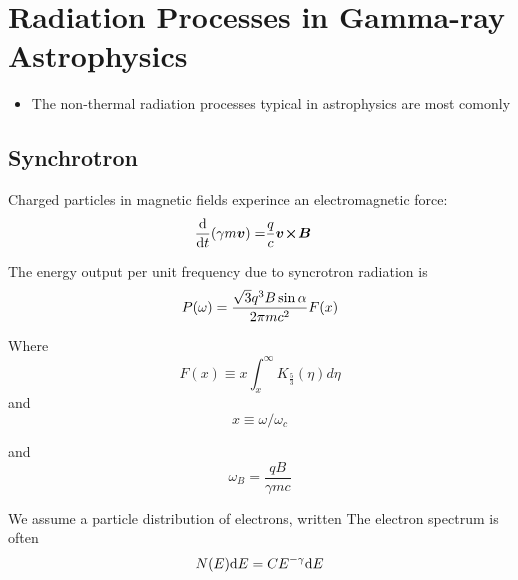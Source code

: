 \section{Radiation Processes in Gamma-ray Astrophysics}



\begin{itemize}
  \item The non-thermal radiation processes typical
    in astrophysics are most comonly
\end{itemize}

\subsection{Synchrotron}


Charged particles in magnetic fields experince an electromagnetic force:
\begin{align}
  \frac{\text{d}}{\text{d}t} (\gamma m \boldsymbol{v}) = & \frac{q}{c} \boldsymbol{v}\!\boldsymbol{\times}\!\boldsymbol{B}
\end{align}

The energy output per unit frequency due to syncrotron radiation is
\begin{equation}
  P(\omega) = \frac{\sqrt{3} q^3 B \sin\alpha}{2\pi m c^2} F(x)
\end{equation}

Where
\begin{equation}
  F(x) \equiv x \int_x^\infty K_{\tfrac{5}{3}} (\eta) d\eta
\end{equation}
and
\begin{equation}
x \equiv \omega/\omega_c
\end{equation}

and
\begin{equation}
  \omega_B = \frac{qB}{\gamma m c}
\end{equation}

We assume a particle distribution of electrons, written 
The electron spectrum is often
\begin{equation}
  N(E) \text{d}E = C E^{-\gamma} \text{d}E
\end{equation}

